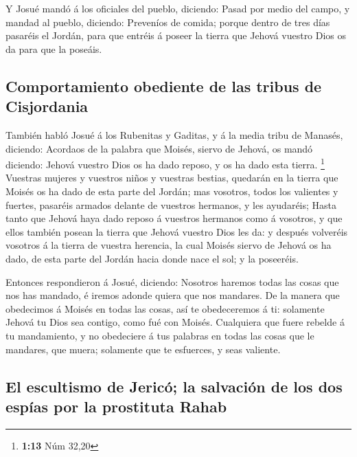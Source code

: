  Y Josué mandó á los oficiales del pueblo, diciendo:
 Pasad por medio del campo, y mandad al pueblo, diciendo:
Preveníos de comida; porque dentro de tres días pasaréis el Jordán, para
que entréis á poseer la tierra que Jehová vuestro Dios os da para que la
poseáis.

\hypertarget{comportamiento-obediente-de-las-tribus-de-cisjordania}{%
\subsection{Comportamiento obediente de las tribus de
Cisjordania}\label{comportamiento-obediente-de-las-tribus-de-cisjordania}}

 También habló Josué á los Rubenitas y Gaditas, y á la
media tribu de Manasés, diciendo:  Acordaos de la palabra
que Moisés, siervo de Jehová, os mandó diciendo: Jehová vuestro Dios os
ha dado reposo, y os ha dado esta tierra. \footnote{\textbf{1:13} Núm
  32,20}  Vuestras mujeres y vuestros niños y vuestras
bestias, quedarán en la tierra que Moisés os ha dado de esta parte del
Jordán; mas vosotros, todos los valientes y fuertes, pasaréis armados
delante de vuestros hermanos, y les ayudaréis;  Hasta tanto
que Jehová haya dado reposo á vuestros hermanos como á vosotros, y que
ellos también posean la tierra que Jehová vuestro Dios les da: y después
volveréis vosotros á la tierra de vuestra herencia, la cual Moisés
siervo de Jehová os ha dado, de esta parte del Jordán hacia donde nace
el sol; y la poseeréis.

 Entonces respondieron á Josué, diciendo: Nosotros haremos
todas las cosas que nos has mandado, é iremos adonde quiera que nos
mandares.  De la manera que obedecimos á Moisés en todas
las cosas, así te obedeceremos á ti: solamente Jehová tu Dios sea
contigo, como fué con Moisés.  Cualquiera que fuere rebelde
á tu mandamiento, y no obedeciere á tus palabras en todas las cosas que
le mandares, que muera; solamente que te esfuerces, y seas valiente.

\hypertarget{el-escultismo-de-jericuxf3-la-salvaciuxf3n-de-los-dos-espuxedas-por-la-prostituta-rahab}{%
\subsection{El escultismo de Jericó; la salvación de los dos espías por
la prostituta
Rahab}\label{el-escultismo-de-jericuxf3-la-salvaciuxf3n-de-los-dos-espuxedas-por-la-prostituta-rahab}}

